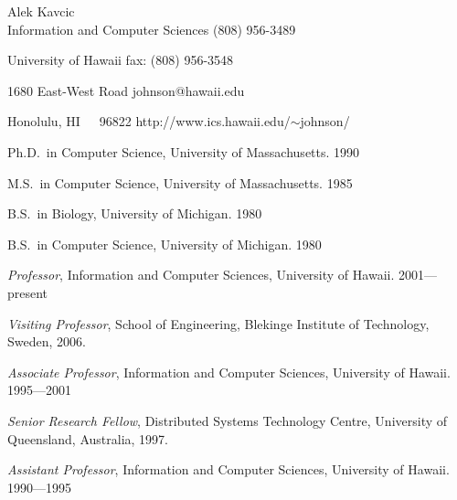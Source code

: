 
\begin{center}
Alek Kavcic \\
Information and Computer Sciences \hfill (808) 956-3489

University of Hawaii              \hfill fax: (808) 956-3548

1680 East-West Road               \hfill johnson@hawaii.edu

Honolulu, HI~~~96822              \hfill http://www.ics.hawaii.edu/$\sim$johnson/

\end{center}

\begin{Professional Preparation}
\item Ph.D.~in Computer Science, University of Massachusetts. 1990 
\item M.S.~in Computer Science, University of Massachusetts.  1985
\item B.S.~in Biology, University of Michigan. 1980
\item B.S.~in Computer Science, University of Michigan. 1980
\end{Professional Preparation}

\begin{Appointments}
\item {\em Professor},  Information and Computer Sciences, University of Hawaii.  2001---present
\item {\em Visiting Professor}, School of Engineering, Blekinge Institute of Technology, Sweden, 2006.
\item {\em Associate Professor},  Information and Computer Sciences, University of Hawaii.  1995---2001
\item {\em Senior Research Fellow},  Distributed Systems Technology Centre, University of Queensland, Australia, 1997.
\item {\em Assistant Professor},   Information and Computer Sciences, University of Hawaii.  1990---1995
\end{Appointments}


